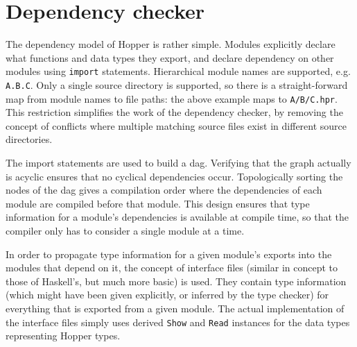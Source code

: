 \section{Dependency checker}
\label{sec:dai_depcheck}

The dependency model of Hopper is rather simple. Modules explicitly declare what functions and data types they export, and declare dependency
on other modules using \texttt{import} statements. Hierarchical module
names are supported, e.g. \texttt{A.B.C}. Only a single
source directory is supported, so there is a straight-forward map from module
names to file paths: the above example maps to \texttt{A/B/C.hpr}. This
restriction simplifies the work of the dependency checker, by removing the concept of conflicts where multiple matching source files exist in different source directories.

The import statements are used to build a \gls{dag}. Verifying that the graph actually is acyclic ensures that no cyclical dependencies occur. Topologically sorting the nodes of the \gls{dag} gives a compilation order where the dependencies of each module are compiled before that module. This design ensures that type information for a module's dependencies is available at compile time, so that the compiler only has to consider a single module at a time.

In order to propagate type information for a given module's exports into the modules that depend on it, the concept of interface files (similar in concept to those of Haskell's\cite{interfacefiles}, but much more basic) is used. They contain type information (which might have been given explicitly, or inferred by the type checker) for everything that is exported from a given module. The actual implementation of the interface files simply uses derived \texttt{Show} and \texttt{Read} instances for the data types representing Hopper types.


